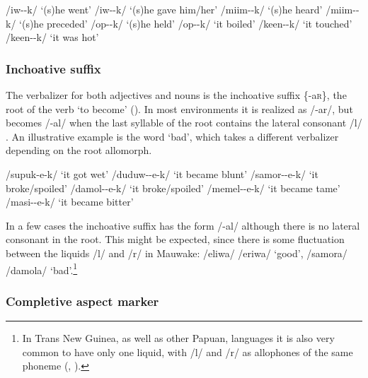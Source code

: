 \ea
\label{ex:2:homophonousroots}
\ea
/iw--k/  `(s)he went'
\ex
/iw--k/  `(s)he gave him/her'
\ex
/miim--k/  `(s)he heard'
\ex
/miim--k/  `(s)he preceded'
\ex
/op--k/  `(s)he held'
\ex
/op--k/  `it boiled'
\ex
/keen--k/  `it touched'
\ex
/keen--k/  `it was hot'
\z
\z

\subsubsection{Inchoative suffix} \label{sec:2.3.3.4}

The verbalizer for both adjectives and nouns is the inchoative suffix \{-a\textsc{r}\}, the root of the verb `to become' ().  In most environments it is realized as /\nobreakdash-ar/, but becomes /-al/ when the last syllable of the root contains the lateral consonant /l/ .  An illustrative example is the word  `bad', which takes a different verbalizer depending on the root allomorph.

\ea
\label{ex:2:inchoative}
\ea
/supuk-e-k/  `it got wet' 
\ex
/duduw--e-k/  `it became blunt'
\ex
/samor--e-k/  `it broke/spoiled'
\ex
/damol--e-k/  `it broke/spoiled'
\ex
/memel--e-k/  `it became tame'
\ex
/masi--e-k/  `it became bitter'
\z
\z

In a few cases the inchoative suffix has the form /-al/ although there is no lateral consonant in the root.  This might be expected, since there is some fluctuation between the liquids /l/ and /r/ in Mauwake: /eliwa/ {\Tilde} /eriwa/ `good', /samora/ {\Tilde} /damola/ `bad'.\footnote{In Trans New Guinea, as well as other Papuan, languages it is also very common to have only one liquid, with /l/ and /r/ as allophones of the same phoneme (\citealt[55]{Wurm1982}, \citealt[55]{Foley1986}).} 


\subsubsection{Completive aspect marker}

